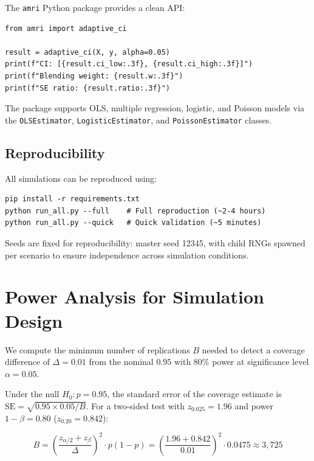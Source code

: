 \documentclass[12pt]{article}
\theoremstyle{definition}
\theoremstyle{remark}
\begin{document}
The \texttt{amri} Python package provides a clean API:

\begin{verbatim}
from amri import adaptive_ci

result = adaptive_ci(X, y, alpha=0.05)
print(f"CI: [{result.ci_low:.3f}, {result.ci_high:.3f}]")
print(f"Blending weight: {result.w:.3f}")
print(f"SE ratio: {result.ratio:.3f}")
\end{verbatim}

The package supports OLS, multiple regression, logistic, and Poisson models
via the \texttt{OLSEstimator}, \texttt{LogisticEstimator}, and
\texttt{PoissonEstimator} classes.

\subsection{Reproducibility}

All simulations can be reproduced using:
\begin{verbatim}
pip install -r requirements.txt
python run_all.py --full    # Full reproduction (~2-4 hours)
python run_all.py --quick   # Quick validation (~5 minutes)
\end{verbatim}

Seeds are fixed for reproducibility: master seed 12345, with child RNGs
spawned per scenario to ensure independence across simulation conditions.


\section{Power Analysis for Simulation Design}
\label{sec:supp_power}

We compute the minimum number of replications $B$ needed to detect a
coverage difference of $\Delta = 0.01$ from the nominal $0.95$ with
80\% power at significance level $\alpha = 0.05$.

Under the null $H_0: p = 0.95$, the standard error of the coverage
estimate is $\text{SE} = \sqrt{0.95 \times 0.05 / B}$. For a two-sided
test with $z_{0.025} = 1.96$ and power $1 - \beta = 0.80$ ($z_{0.20} = 0.842$):

\begin{equation}
B = \left(\frac{z_{\alpha/2} + z_\beta}{\Delta}\right)^2 \cdot p(1-p)
= \left(\frac{1.96 + 0.842}{0.01}\right)^2 \cdot 0.0475
\approx 3{,}725
\end{equation}
\end{document}
